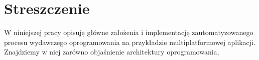 \section{Streszczenie}

W niniejszej pracy opisuję główne założenia i implementację zautomatyzowanego 
procesu wydawczego oprogramowania na przykładzie multiplatformowej aplikacji.
Znajdziemy w niej zarówno objaśnienie architektury oprogramowania, 


